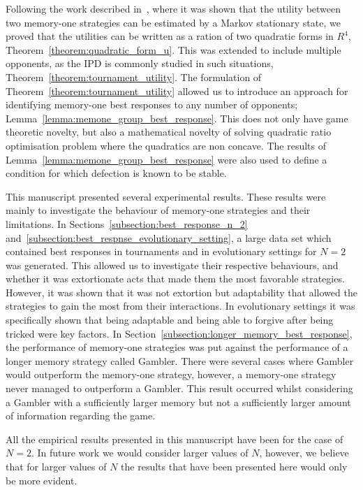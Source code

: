 \documentclass[10pt]{article}
\begin{document}
Following the work described in~\cite{Nowak1989}, where it was shown that the
utility between two memory-one strategies can be estimated by a Markov
stationary state, we proved that the utilities can be written as a ration of two
quadratic forms in $R^4$, Theorem~\ref{theorem:quadratic_form_u}. This was
extended to include multiple opponents, as the IPD is commonly studied in such
situations, Theorem~\ref{theorem:tournament_utility}.
The formulation of Theorem~\ref{theorem:tournament_utility} allowed us to introduce an approach for identifying
memory-one best responses to any number of opponents;
Lemma~\ref{lemma:memone_group_best_response}. This does not only have game
theoretic novelty, but also a mathematical novelty of solving quadratic ratio
optimisation problem where the quadratics are non concave. The results of
Lemma~\ref{lemma:memone_group_best_response} were also used to define a
condition for which defection is known to be stable.

This manuscript presented several experimental results. These results were mainly to
investigate the behaviour of memory-one strategies and their limitations. In
Sections~\ref{subsection:best_response_n_2}
and~\ref{subsection:best_respnse_evolutionary_setting}, a large data set which
contained best responses in tournaments and in evolutionary settings for $N=2$
was generated. This allowed us to investigate their respective behaviours, and
whether it was extortionate acts that made them the most favorable strategies.
However, it was shown that it was not extortion but adaptability that allowed
the strategies to gain the most from their interactions.
In evolutionary settings it was specifically shown that being adaptable and being
able to forgive after being tricked were key factors. In Section~\ref{subsection:longer_memory_best_response}, the performance of
memory-one strategies was put against the performance of a longer memory
strategy called Gambler. There were several cases where Gambler would outperform
the memory-one strategy, however, a memory-one strategy never managed to outperform
a Gambler. This result occurred whilst considering a Gambler with a sufficiently
larger memory but not a sufficiently larger amount of information regarding
the game.

All the empirical results presented in this manuscript have been for the
case of $N=2$. In future work we would consider larger values of $N$, however, we
believe that for larger values of $N$ the results that have been presented here would
only be more evident.
\end{document}
